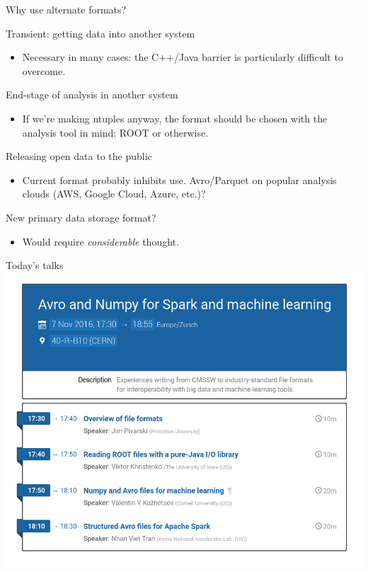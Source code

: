 \documentclass{beamer}
\begin{document}
\begin{frame}{Why use alternate formats?}
\vspace{0.25 cm}
\begin{block}{Transient: getting data into another system}
\begin{itemize}
\item Necessary in many cases: the C++/Java barrier is particularly difficult to overcome.
\end{itemize}
\end{block}

\begin{block}{End-stage of analysis in another system}
\begin{itemize}
\item If we're making ntuples anyway, the format should be chosen with the analysis tool in mind: ROOT or otherwise.
\end{itemize}
\end{block}

\begin{block}{Releasing open data to the public}
\begin{itemize}
\item Current format probably inhibits use. Avro/Parquet on popular analysis clouds (AWS, Google Cloud, Azure, etc.)?
\end{itemize}
\end{block}

\begin{block}{New primary data storage format?}
\begin{itemize}
\item Would require {\it considerable} thought.
\end{itemize}
\end{block}
\end{frame}

\begin{frame}{Today's talks}
\includegraphics[width=\linewidth]{schedule.png}
\end{frame}
\end{document}

